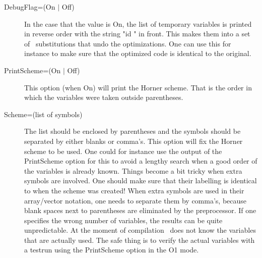 \begin{description}
\item[DebugFlag=(On $|$ Off)] \label{optimdebugflag}
In the case that the value is On, the list of temporary variables is 
printed in reverse order with the string "id " in front. This makes 
them into a set of \FORM\ substitutions that undo the optimizations. One 
can use this for instance to make sure that the optimized code is identical 
to the original.
\item[PrintScheme=(On $|$ Off)]
This option (when On) will print the Horner scheme. That is the order in 
which the variables were taken outside parentheses.
\item[Scheme=(list of symbols)] The list should be enclosed by parentheses 
and the symbols should be separated by either blanks or comma's. This 
option will fix the Horner scheme to be used. One 
could for instance use the output of the PrintScheme option for this to 
avoid a lengthy search when a good order of the variables is already known. 
Things become a bit tricky when extra symbols are involved. One should make 
sure that their labelling is identical to when the scheme was created! When 
extra symbols are used in their array/vector notation, one needs to 
separate them by comma's, because blank spaces next to parentheses are 
eliminated by the preprocessor. If one specifies the wrong number of 
variables, the results can be quite unpredictable. At the moment of 
compilation \FORM\ does not know the variables that are actually used. The 
safe thing is to verify the actual variables with a testrun using the 
PrintScheme option in the O1 mode.
\end{description}

